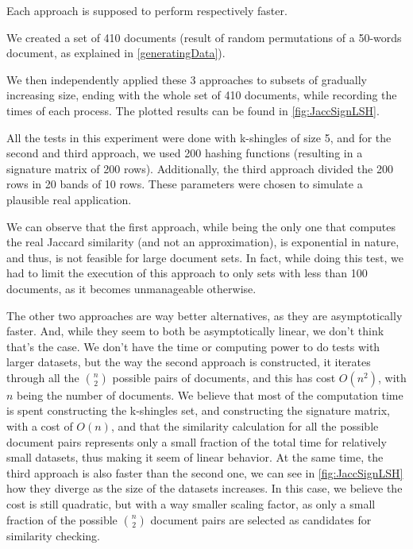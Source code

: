 \documentclass[12pt]{article}
\begin{document}
{Each approach is supposed to perform respectively faster.

\bigskip
We created a set of 410 documents (result of random permutations of a 50-words document, as explained in \autoref{generatingData}). 

We then independently applied these 3 approaches to subsets of gradually increasing size, ending with the whole set of 410 documents, while recording the times of each process.
The plotted results can be found in \autoref{fig:JaccSignLSH}.

All the tests in this experiment were done with k-shingles of size 5, and for the second and third approach, we used 200 hashing functions (resulting in a signature matrix of 200 rows). Additionally, the third approach divided the 200 rows in 20 bands of 10 rows. These parameters were chosen to simulate a plausible real application.

\bigskip

We can observe that the first approach, while being the only one that computes the real Jaccard similarity (and not an approximation), is exponential in nature, and thus, is not feasible for large document sets. In fact, while doing this test, we had to limit the execution of this approach to only sets with less than 100 documents, as it becomes unmanageable otherwise.

The other two approaches are way better alternatives, as they are asymptotically faster.
And, while they seem to both be asymptotically linear, we don't think that's the case.
We don't have the time or computing power to do tests with larger datasets, but the way the second approach is constructed, it iterates through all the $\binom{n}{2}$ possible pairs of documents, and this has cost $O(n^2)$, with $n$ being the number of documents. 
We believe that most of the computation time is spent constructing the k-shingles set, and constructing the signature matrix, with a cost of $O(n)$, and that the similarity calculation for all the possible document pairs represents only a small fraction of the total time for relatively small datasets, thus making it seem of linear behavior.
At the same time, the third approach is also faster than the second one, we can see in \autoref{fig:JaccSignLSH} how they diverge as the size of the datasets increases.
In this case, we believe the cost is still quadratic, but with a way smaller scaling factor, as only a small fraction of the possible $\binom{n}{2}$ document pairs are selected as candidates for similarity checking.
\bigskip

}
\end{document}
